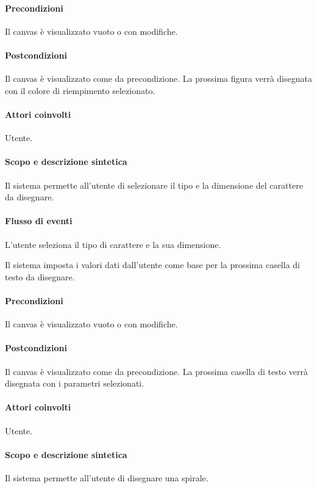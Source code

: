 \paragraph{Precondizioni} Il canvas \`e visualizzato vuoto o con modifiche.
\paragraph{Postcondizioni} Il canvas \`e visualizzato come da precondizione. La prossima figura verr\` a disegnata con il colore di riempimento selezionato.

\paragraph{Attori coinvolti} Utente.
\paragraph{Scopo e descrizione sintetica} 
Il sistema permette all'utente di selezionare il tipo e la dimensione del carattere da disegnare.
\paragraph{Flusso di eventi}
\begin{elenconumerato}[\textbf{}]{\subsubsecindent}
\item L'utente seleziona il tipo di carattere e la sua dimensione.
\item Il sistema imposta i valori dati dall'utente come base per la prossima casella di testo da disegnare.
\end{elenconumerato}
\paragraph{Precondizioni} Il canvas \`e visualizzato vuoto o con modifiche.
\paragraph{Postcondizioni} Il canvas \`e visualizzato come da precondizione. La prossima casella di testo verr\` a disegnata con i parametri selezionati.

\paragraph{Attori coinvolti} Utente.
\paragraph{Scopo e descrizione sintetica} 
Il sistema permette all'utente di disegnare una spirale.
